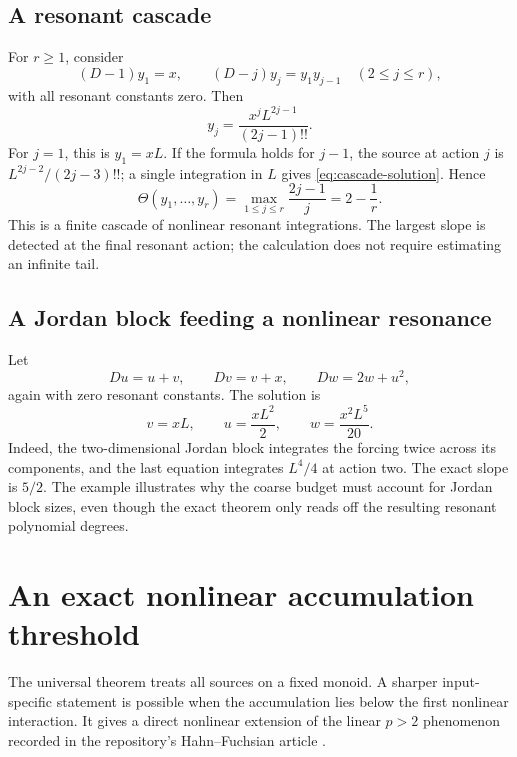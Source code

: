 \documentclass[11pt,a4paper]{article}
\numberwithin{equation}{section}
\theoremstyle{definition}
\theoremstyle{remark}
\begin{document}
\subsection{A resonant cascade}
For \(r\ge1\), consider
\begin{equation}\label{eq:cascade}
 (D-1)y_1=x,\qquad
 (D-j)y_j=y_1y_{j-1}\quad(2\le j\le r),
\end{equation}
with all resonant constants zero. Then
\begin{equation}\label{eq:cascade-solution}
 y_j=\frac{x^jL^{2j-1}}{(2j-1)!!}.
\end{equation}
For \(j=1\), this is \(y_1=xL\). If the formula holds for
\(j-1\), the source at action \(j\) is
\(L^{2j-2}/(2j-3)!!\); a single integration in \(L\) gives
\eqref{eq:cascade-solution}. Hence
\begin{equation}\label{eq:cascade-slope}
 \Theta(y_1,\ldots,y_r)=\max_{1\le j\le r}\frac{2j-1}{j}
                    =2-\frac1r.
\end{equation}
This is a finite cascade of nonlinear resonant integrations.
The largest slope is detected at the final resonant action; the
calculation does not require estimating an infinite tail.

\subsection{A Jordan block feeding a nonlinear resonance}
Let
\begin{equation}\label{eq:jordan-example}
 Du=u+v,\qquad Dv=v+x,\qquad Dw=2w+u^2,
\end{equation}
again with zero resonant constants. The solution is
\begin{equation}\label{eq:jordan-solution}
 v=xL,\qquad u=\frac{xL^2}{2},\qquad
 w=\frac{x^2L^5}{20}.
\end{equation}
Indeed, the two-dimensional Jordan block integrates the forcing twice
across its components, and the last equation integrates
\(L^4/4\) at action two. The exact slope is \(5/2\).
The example illustrates why the coarse budget must account for Jordan
block sizes, even though the exact theorem only reads off the
resulting resonant polynomial degrees.

\section{An exact nonlinear accumulation threshold}
\label{sec:accumulation}

The universal theorem treats all sources on a fixed monoid. A sharper
input-specific statement is possible when the accumulation lies below
the first nonlinear interaction. It gives a direct nonlinear extension
of the linear \(p>2\) phenomenon recorded in the repository's
Hahn--Fuchsian article \cite{repo-fuchsian}.
\end{document}
